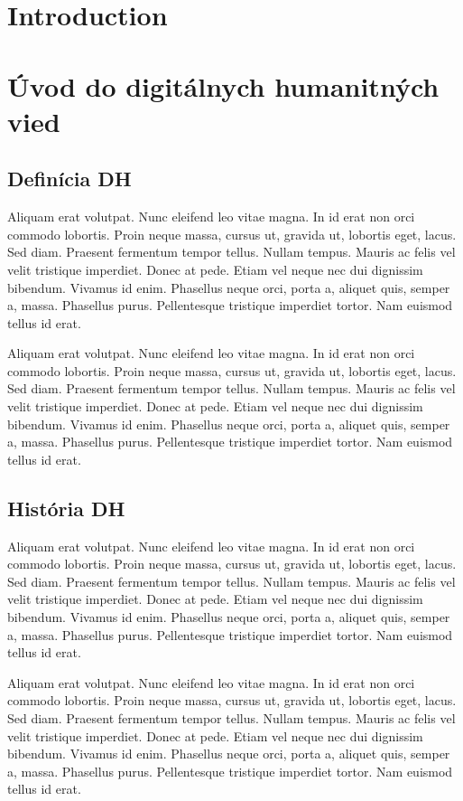 \documentclass[
  titlepage,
  openright,
  DIV=calc,
  toc=listof,
  listof=nochaptergap]{scrbook}
\begin{document}
\chapter{Introduction}\label{sec:introduction}

\chapter{Úvod do digitálnych humanitných vied}\label{sec:uvod}

\section{Definícia DH}\label{definuxedcia-dh}

Aliquam erat volutpat. Nunc eleifend leo vitae magna. In id erat non
orci commodo lobortis. Proin neque massa, cursus ut, gravida ut,
lobortis eget, lacus. Sed diam. Praesent fermentum tempor tellus. Nullam
tempus. Mauris ac felis vel velit tristique imperdiet. Donec at pede.
Etiam vel neque nec dui dignissim bibendum. Vivamus id enim. Phasellus
neque orci, porta a, aliquet quis, semper a, massa. Phasellus purus.
Pellentesque tristique imperdiet tortor. Nam euismod tellus id erat.

Aliquam erat volutpat. Nunc eleifend leo vitae magna. In id erat non
orci commodo lobortis. Proin neque massa, cursus ut, gravida ut,
lobortis eget, lacus. Sed diam. Praesent fermentum tempor tellus. Nullam
tempus. Mauris ac felis vel velit tristique imperdiet. Donec at pede.
Etiam vel neque nec dui dignissim bibendum. Vivamus id enim. Phasellus
neque orci, porta a, aliquet quis, semper a, massa. Phasellus purus.
Pellentesque tristique imperdiet tortor. Nam euismod tellus id erat.

\section{História DH}\label{histuxf3ria-dh}

Aliquam erat volutpat. Nunc eleifend leo vitae magna. In id erat non
orci commodo lobortis. Proin neque massa, cursus ut, gravida ut,
lobortis eget, lacus. Sed diam. Praesent fermentum tempor tellus. Nullam
tempus. Mauris ac felis vel velit tristique imperdiet. Donec at pede.
Etiam vel neque nec dui dignissim bibendum. Vivamus id enim. Phasellus
neque orci, porta a, aliquet quis, semper a, massa. Phasellus purus.
Pellentesque tristique imperdiet tortor. Nam euismod tellus id erat.

Aliquam erat volutpat. Nunc eleifend leo vitae magna. In id erat non
orci commodo lobortis. Proin neque massa, cursus ut, gravida ut,
lobortis eget, lacus. Sed diam. Praesent fermentum tempor tellus. Nullam
tempus. Mauris ac felis vel velit tristique imperdiet. Donec at pede.
Etiam vel neque nec dui dignissim bibendum. Vivamus id enim. Phasellus
neque orci, porta a, aliquet quis, semper a, massa. Phasellus purus.
Pellentesque tristique imperdiet tortor. Nam euismod tellus id erat.
\end{document}

